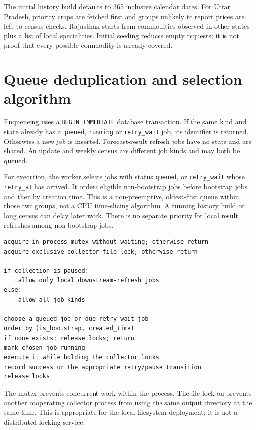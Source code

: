 \documentclass[12pt,a4paper,oneside]{report}
\numberwithin{equation}{chapter}
\numberwithin{figure}{chapter}
\numberwithin{table}{chapter}
\theoremstyle{definition}
\begin{document}
The initial history build defaults to 365 inclusive calendar dates. For Uttar Pradesh, priority crops are fetched first and groups unlikely to report prices are left to census checks. Rajasthan starts from commodities observed in other states plus a list of local specialities. Initial seeding reduces empty requests; it is not proof that every possible commodity is already covered.

\section{Queue deduplication and selection algorithm}
Enqueueing uses a \texttt{BEGIN IMMEDIATE} database transaction. If the same kind and state already has a \texttt{queued}, \texttt{running} or \texttt{retry\_wait} job, its identifier is returned. Otherwise a new job is inserted. Forecast-result refresh jobs have no state and are shared. An update and weekly census are different job kinds and may both be queued.

For execution, the worker selects jobs with status \texttt{queued}, or \texttt{retry\_wait} whose \texttt{retry\_at} has arrived. It orders eligible non-bootstrap jobs before bootstrap jobs and then by creation time. This is a non-preemptive, oldest-first queue within those two groups, not a CPU time-slicing algorithm. A running history build or long census can delay later work. There is no separate priority for local result refreshes among non-bootstrap jobs.

\begin{lstlisting}[caption={Selection of the next eligible backend job}]
acquire in-process mutex without waiting; otherwise return
acquire exclusive collector file lock; otherwise return

if collection is paused:
    allow only local downstream-refresh jobs
else:
    allow all job kinds

choose a queued job or due retry-wait job
order by (is_bootstrap, created_time)
if none exists: release locks; return
mark chosen job running
execute it while holding the collector locks
record success or the appropriate retry/pause transition
release locks
\end{lstlisting}

The mutex prevents concurrent work within the process. The file lock on  prevents another cooperating collector process from using the same output directory at the same time. This is appropriate for the local filesystem deployment; it is not a distributed locking service.
\end{document}

